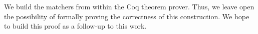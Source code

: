 \documentclass{article}
\begin{document}

We build the matchers from within the Coq theorem prover.
Thus, we leave open the possibility of formally proving the
correctness of this construction.
We hope to build this proof as a follow-up to this work.


\printbibliography[heading=none]
\end{document}
